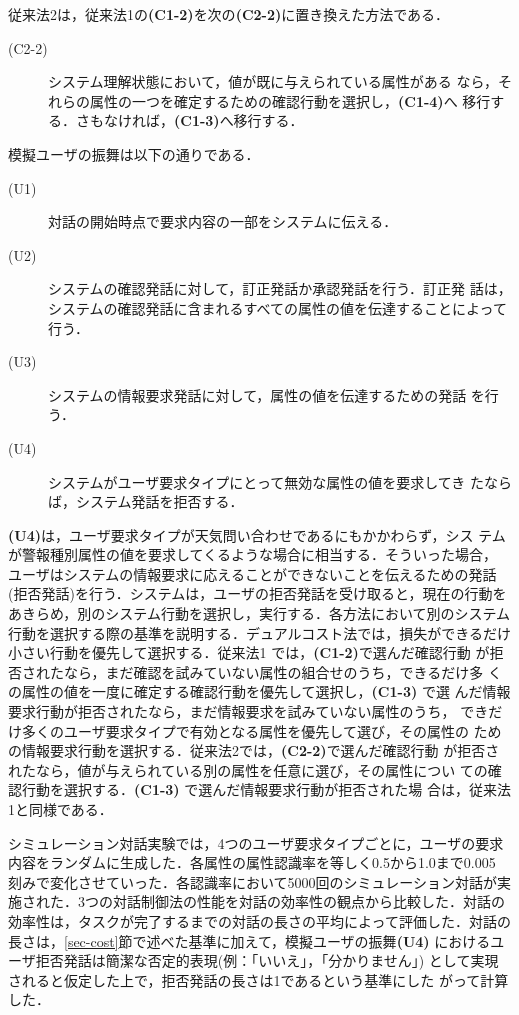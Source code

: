 従来法2は，従来法1の{\bf (C1-2)}を次の{\bf (C2-2)}に置き換えた方法である．

\begin{description}
\item[(C2-2)] システム理解状態において，値が既に与えられている属性がある
なら，それらの属性の一つを確定するための確認行動を選択し，{\bf (C1-4)}へ
移行する．さもなければ，{\bf (C1-3)}へ移行する．
\end{description}

模擬ユーザの振舞は以下の通りである．

\begin{description}
\item[(U1)] 対話の開始時点で要求内容の一部をシステムに伝える．
\item[(U2)] システムの確認発話に対して，訂正発話か承認発話を行う．訂正発
話は，システムの確認発話に含まれるすべての属性の値を伝達することによって
行う．
\item[(U3)] システムの情報要求発話に対して，属性の値を伝達するための発話
を行う．
\item[(U4)] システムがユーザ要求タイプにとって無効な属性の値を要求してき
たならば，システム発話を拒否する．
\end{description}

{\bf (U4)}は，ユーザ要求タイプが天気問い合わせであるにもかかわらず，シス
テムが警報種別属性の値を要求してくるような場合に相当する．そういった場合，
ユーザはシステムの情報要求に応えることができないことを伝えるための発話
(拒否発話)を行う．システムは，ユーザの拒否発話を受け取ると，現在の行動を
あきらめ，別のシステム行動を選択し，実行する．各方法において別のシステム
行動を選択する際の基準を説明する．デュアルコスト法では，損失ができるだけ
小さい行動を優先して選択する．従来法1 では，{\bf (C1-2)}で選んだ確認行動
が拒否されたなら，まだ確認を試みていない属性の組合せのうち，できるだけ多
くの属性の値を一度に確定する確認行動を優先して選択し，{\bf (C1-3)} で選
んだ情報要求行動が拒否されたなら，まだ情報要求を試みていない属性のうち，
できだけ多くのユーザ要求タイプで有効となる属性を優先して選び，その属性の
ための情報要求行動を選択する．従来法2では，{\bf (C2-2)}で選んだ確認行動
が拒否されたなら，値が与えられている別の属性を任意に選び，その属性につい
ての確認行動を選択する．{\bf (C1-3)} で選んだ情報要求行動が拒否された場
合は，従来法1と同様である．

シミュレーション対話実験では，4つのユーザ要求タイプごとに，ユーザの要求
内容をランダムに生成した．各属性の属性認識率を等しく0.5から1.0まで0.005 
刻みで変化させていった．各認識率において5000回のシミュレーション対話が実
施された．3つの対話制御法の性能を対話の効率性の観点から比較した．対話の
効率性は，タスクが完了するまでの対話の長さの平均によって評価した．対話の
長さは，\ref{sec-cost}節で述べた基準に加えて，模擬ユーザの振舞{\bf (U4)} 
におけるユーザ拒否発話は簡潔な否定的表現(例：「いいえ」，「分かりません」)
として実現されると仮定した上で，拒否発話の長さは1であるという基準にした
がって計算した．


